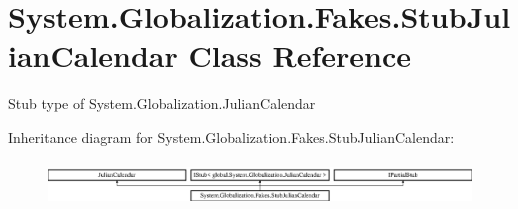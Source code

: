 \hypertarget{class_system_1_1_globalization_1_1_fakes_1_1_stub_julian_calendar}{\section{System.\-Globalization.\-Fakes.\-Stub\-Julian\-Calendar Class Reference}
\label{class_system_1_1_globalization_1_1_fakes_1_1_stub_julian_calendar}
}


Stub type of System.\-Globalization.\-Julian\-Calendar 


Inheritance diagram for System.\-Globalization.\-Fakes.\-Stub\-Julian\-Calendar\-:\begin{figure}[H]
\begin{center}
\leavevmode
\includegraphics[height=1.181435cm]{class_system_1_1_globalization_1_1_fakes_1_1_stub_julian_calendar}
\end{center}
\end{figure}
